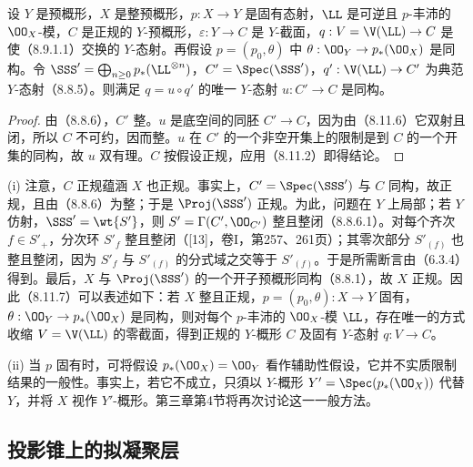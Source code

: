  设 $Y$ 是预概形，$X$ 是整预概形，$p:X\to Y$ 是固有态射，$\LL$ 是可逆且 $p$-丰沛的 $\OO_X$-模，$C$ 是正规的 $Y$-预概形，$\varepsilon:Y\to C$ 是 $Y$-截面，$q:V=\V(\LL)\to C$ 是使（8.9.1.1）交换的 $Y$-态射。再假设 $p=(p_0,\theta)$ 中 $\theta:\OO_Y\to p_*(\OO_X)$ 是同构。令 $\SSS'=\bigoplus_{n\geq0}p_*(\LL^{\otimes n})$，$C'=\Spec(\SSS')$，$q':\V(\LL)\to C'$ 为典范 $Y$-态射（8.8.5）。则满足 $q=u\circ q'$ 的唯一 $Y$-态射 $u:C'\to C$ 是同构。
\begin{proof}
由（8.8.6），$C'$ 整。$u$ 是底空间的同胚 $C'\to C$，因为由（8.11.6）它双射且闭，所以 $C$ 不可约，因而整。$u$ 在 $C'$ 的一个非空开集上的限制是到 $C$ 的一个开集的同构，故 $u$ 双有理。$C$ 按假设正规，应用（8.11.2）即得结论。
\end{proof}

 (i) 注意，$C$ 正规蕴涵 $X$ 也正规。事实上，$C'=\Spec(\SSS')$ 与 $C$ 同构，故正规，且由（8.8.6）为整；于是 $\Proj(\SSS')$ 正规。为此，问题在 $Y$ 上局部；若 $Y$ 仿射，$\SSS'=\wt{S'}$，则 $S'=\Gamma(C',\OO_{C'})$ 整且整闭（8.8.6.1）。对每个齐次 $f\in S'_+$，分次环 $S'_f$ 整且整闭（[13]，卷I，第257、261页）；其零次部分 $S'_{(f)}$ 也整且整闭，因为 $S'_f$ 与 $S'_{(f)}$ 的分式域之交等于 $S'_{(f)}$。于是所需断言由（6.3.4）得到。最后，$X$ 与 $\Proj(\SSS')$ 的一个开子预概形同构（8.8.1），故 $X$ 正规。因此（8.11.7）可以表述如下：若 $X$ 整且正规，$p=(p_0,\theta):X\to Y$ 固有，$\theta:\OO_Y\to p_*(\OO_X)$ 是同构，则对每个 $p$-丰沛的 $\OO_X$-模 $\LL$，存在唯一的方式收缩 $V=\V(\LL)$ 的零截面，得到正规的 $Y$-概形 $C$ 及固有 $Y$-态射 $q:V\to C$。

(ii) 当 $p$ 固有时，可将假设 $p_*(\OO_X)=\OO_Y$ 看作辅助性假设，它并不实质限制结果的一般性。事实上，若它不成立，只須以 $Y$-概形 $Y'=\Spec(p_*(\OO_X))$ 代替 $Y$，并将 $X$ 视作 $Y'$-概形。第三章第4节将再次讨论这一一般方法。

\subsection{投影锥上的拟凝聚层}

